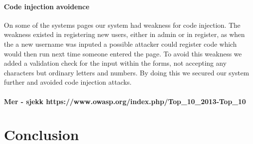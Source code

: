 \documentclass[11pt, a4paper]{article}
\begin{document}
\paragraph{Code injection avoidence}
On some of the systems pages our system had weakness for code injection. The weakness existed in registering new users, either in admin or in register, as when the a new username was inputed a possible attacker could register code which would then run next time someone entered the page. To avoid this weakness we added a validation check for the input within the forms, not accepting any characters but ordinary letters and numbers. By doing this we secured our system further and avoided code injection attacks. 
\paragraph{Mer - sjekk https://www.owasp.org/index.php/Top\_10\_2013-Top\_10}
\section{Conclusion}
\end{document}
